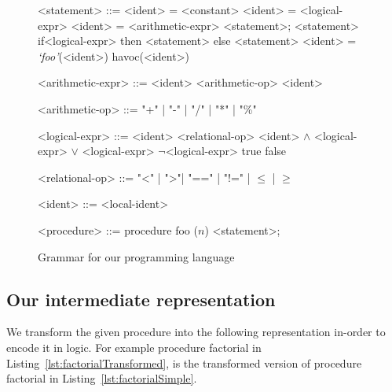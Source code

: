 \documentclass{llncs}
\newcommand{\foo}{\textit{`foo'}}
\newcommand{\n}{\textit{n}}
\begin{document}
\begin{figure}[hb!]
  \begin{grammar}
    <statement> ::= <ident> = <constant>
    \alt <ident> = <logical-expr>
    \alt <ident> = <arithmetic-expr>
    \alt <statement>; <statement>
    \alt if<logical-expr> then <statement> else <statement>
    \alt <ident> = \foo(<ident>)
    \alt havoc(<ident>)


    <arithmetic-expr> ::= <ident> <arithmetic-op> <ident>

     <arithmetic-op> ::= "+"  |  "-"  |  "/"  |  "*" |  "\%"
 
    <logical-expr> ::= <ident> <relational-op> <ident>
     $\wedge$ <logical-expr>
     $\vee$ <logical-expr>
    \alt $\neg$<logical-expr>
    \alt true
    \alt false

     <relational-op> ::= "<" | ">"| "==" | "!=" | $\leq$ | $\geq$

    <ident> ::= <local-ident>
    
    <procedure> ::= procedure foo ($\n$) {<statement>;}
  \end{grammar}
  \caption{Grammar for our programming language}
  \label{fig:grammar}
\end{figure}

\subsection{Our intermediate representation}\label{sec:intermediate}
We transform the given procedure into the following representation
in-order to encode it in logic. For example procedure factorial
in Listing~\ref{lst:factorialTransformed}, is the transformed version
of procedure factorial in Listing~\ref{lst:factorialSimple}.
\end{document}
